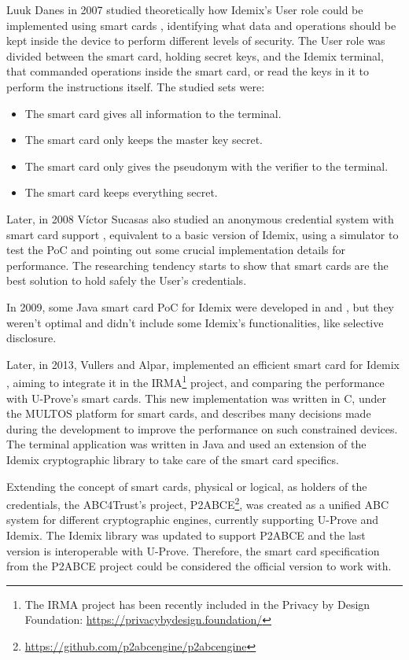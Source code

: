 \documentclass[journal]{IEEEtran}
\begin{document}
Luuk Danes in 2007 studied theoretically how Idemix's User role could be implemented using  
smart cards \cite{luuk}, identifying what data and operations should be kept inside the device to perform different levels of security. The User role was divided between the smart card, holding secret keys, and the Idemix terminal, that commanded operations inside the smart card, or read the keys in it to perform the instructions itself. The studied sets were:
\begin{itemize}
	\item The smart card gives all information to the terminal.
	\item The smart card only keeps the master key secret.
	\item The smart card only gives the pseudonym with the verifier to the terminal.
	\item The smart card keeps everything secret.
\end{itemize}

Later, in 2008 Víctor Sucasas also studied an anonymous credential system with smart card support \cite{sucasas}, equivalent to a basic version of Idemix, using a simulator to test the PoC and pointing out some crucial implementation details for performance. The researching tendency starts to show that smart cards are the best solution to hold safely the User's credentials.

In 2009, some Java smart card PoC for Idemix were developed in \cite{javaIdemix1} and \cite{javaIdemix2}, but they weren't optimal and didn't include some Idemix's functionalities, like selective disclosure.

Later, in 2013, Vullers and Alpar, implemented an efficient smart card for Idemix \cite{vullers2013efficient}, aiming to integrate it in the IRMA\footnote{The IRMA project has been recently included in the Privacy by Design Foundation: \url{https://privacybydesign.foundation/}} project, and comparing the performance with U-Prove's smart cards. This new implementation was written in C, under the MULTOS platform for smart cards, and describes many decisions made during the development to improve the performance on such constrained devices. The terminal application was written in Java and used an extension of the Idemix cryptographic library to take care of the smart card specifics.


Extending the concept of smart cards, physical or logical, as holders of the credentials, the ABC4Trust's project, P2ABCE\footnote{\url{https://github.com/p2abcengine/p2abcengine}}, was created as a unified ABC system for different cryptographic engines, currently supporting U-Prove and Idemix. The Idemix library was updated to support P2ABCE and the last version is interoperable with U-Prove. Therefore, the smart card specification from the P2ABCE project could be considered the official version to work with.
\end{document}
